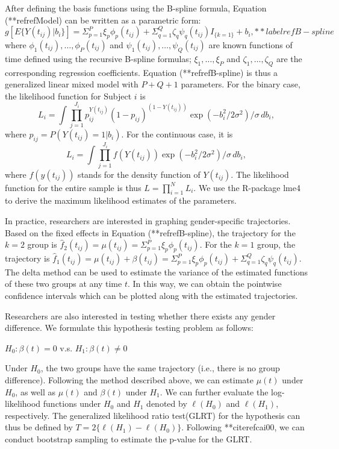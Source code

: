 After defining the basis functions using the B-spline formula,
Equation (**refref{Model}) can be written as a parametric form:
\begin{equation}
g[E\{Y(t_{ij})|b_{i}\}]=\Sigma_{p=1}^{P}\xi_{p}\phi_{p}(t_{ij})+\Sigma_{q=1}^{Q}\zeta_{q}\psi_{q}(t_{ij})I_{\{k=1\}}+b_i,
**labelref{B-spline}
\end{equation}
where $\phi_{1}(t_{ij}),\ldots,\phi_{P}(t_{ij})$ and
$\psi_{1}(t_{ij}),\ldots,\psi_{Q}(t_{ij})$ are known functions of
time defined using the recursive B-spline formulas;
$\xi_1,\ldots,\xi_P$ and $\zeta_1,\ldots,\zeta_Q$ are the
corresponding regression coefficients. Equation (**refref{B-spline})
is thus a generalized linear mixed model with $P+Q+1$ parameters.
For the binary case, the likelihood function for Subject $i$ is
$$
L_{i}=\int\prod_{j=1}^{J_{i}}
p_{ij}^{Y(t_{ij})}(1-p_{ij})^{(1-Y(t_{ij}))}
\exp(-b_i^2/2\sigma^2)/\sigma\,d b_i,
$$
where $p_{ij}=P(Y(t_{ij})=1|b_i)$.
For the continuous case, it is
$$
L_{i}=\int\prod_{j=1}^{J_{i}}f(Y(t_{ij}))\exp(-b_i^2/2\sigma^2)/\sigma\,d
b_i,
$$
where $f(y(t_{ij}))$ stands for the density function of
$Y(t_{ij})$. The likelihood function for the entire sample is thus
$L=\prod_{i=1}^{N}L_{i}$. We use the R-package lme4 to derive the
maximum likelihood estimates of the parameters.

In practice, researchers are interested in graphing
gender-specific trajectories. Based on the fixed effects in
Equation (**refref{B-spline}), the trajectory for the $k=2$ group is
$\hat{f}_{2}(t_{ij})=\mu(t_{ij})=\Sigma_{p=1}^{P}\xi_{p}\phi_{p}(t_{ij})$.
For the $k=1$ group, the trajectory is
$\hat{f}_{1}(t_{ij})=\mu(t_{ij})+\beta(t_{ij})=\Sigma_{p=1}^{P}\xi_{p}\phi_{p}(t_{ij})+\Sigma_{q=1}^{Q}\zeta_{q}\psi_{q}(t_{ij})$.
The delta method can be used to estimate the variance of the
estimated functions of these two groups at any time $t$. In this
way, we can obtain the pointwise confidence intervals which can be
plotted along with the estimated trajectories.

Researchers are also interested in testing whether there exists
any gender difference. We formulate this hypothesis testing
problem as follows:
\begin{center}
$H_{0}: \beta(t)=0$ v.s. $H_{1}: \beta(t)\neq0$
\end{center}
Under $H_{0}$, the two groups have the same trajectory (i.e.,
there is no group difference). Following the method described
above, we can estimate $\mu(t)$ under $H_{0}$, as well as $\mu(t)$
and $\beta(t)$ under $H_{1}$. We can further evaluate the
log-likelihood functions under $H_{0}$ and $H_{1}$ denoted by
$\ell(H_{0})$ and $\ell(H_{1})$, respectively. The generalized
likelihood ratio test(GLRT) for the hypothesis can thus be defined
by $T=2\{\ell(H_{1})-\ell(H_{0})\}$. Following **citeref{cai00}, we
can conduct bootstrap sampling to estimate the p-value for the
GLRT.


